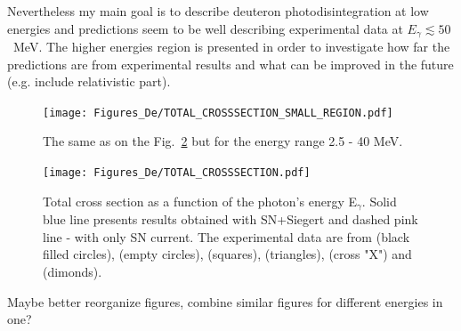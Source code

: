     Nevertheless my main goal is to describe deuteron photodisintegration at low energies and predictions seem to be well describing experimental data at
    $E_\gamma \lesssim 50$~MeV. The higher energies region is presented in order
    to investigate how far the predictions are from experimental results and 
    what can be improved in the future (e.g. include relativistic part). 
    
    \begin{figure}[h]
        \begin{center}
        \texttt{[image: Figures\_De/TOTAL\_CROSSSECTION\_SMALL\_REGION.pdf]}
        \end{center}
        \caption{The same as on the Fig.~\ref{TOTAL_CROSS} but for the energy range 2.5 - 40 MeV.
        }
        \label{TOTAL_CROSS_small}
    \end{figure}

    
    \begin{figure}[h]
        \begin{center}
        \texttt{[image: Figures\_De/TOTAL\_CROSSSECTION.pdf]}
        \end{center}
        \caption{Total cross section as a function of the photon's energy E$_\gamma$.
        Solid blue line presents results obtained with SN+Siegert 
        and dashed pink line - with only SN current.
        The experimental data are from \cite{Bernabei1986} (black filled circles),
        \cite{BOSMAN1979} (empty circles),
        \cite{ARENDS1984} (squares),
        \cite{Skopik1974} (triangles),
        \cite{Moreh1989} (cross "X") and
        \cite{Birenbaum1985} (dimonds).
        }
        \label{TOTAL_CROSS}
    \end{figure}
    
        
    {\color{red} Maybe better reorganize figures, combine similar figures for different energies in one?}

